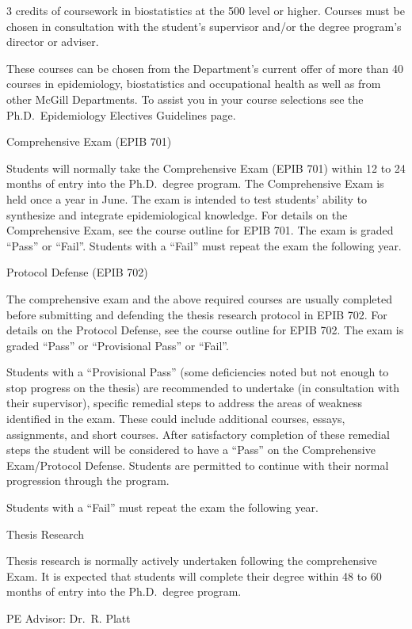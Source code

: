 \documentclass[
]{book}
\begin{document}
3 credits of coursework in biostatistics at the 500 level or higher. Courses must be chosen in consultation with the student's supervisor and/or the degree program's director or adviser.

These courses can be chosen from the Department's current offer of more than 40 courses in epidemiology, biostatistics and occupational health as well as from other McGill Departments. To assist you in your course selections see the Ph.D.~Epidemiology Electives Guidelines page.

Comprehensive Exam (EPIB 701)

Students will normally take the Comprehensive Exam (EPIB 701) within 12 to 24 months of entry into the Ph.D.~degree program. The Comprehensive Exam is held once a year in June. The exam is intended to test students' ability to synthesize and integrate epidemiological knowledge. For details on the Comprehensive Exam, see the course outline for EPIB 701. The exam is graded ``Pass'' or ``Fail''. Students with a ``Fail'' must repeat the exam the following year.

Protocol Defense (EPIB 702)

The comprehensive exam and the above required courses are usually completed before submitting and defending the thesis research protocol in EPIB 702. For details on the Protocol Defense, see the course outline for EPIB 702. The exam is graded ``Pass'' or ``Provisional Pass'' or ``Fail''.

Students with a ``Provisional Pass'' (some deficiencies noted but not enough to stop progress on the thesis) are recommended to undertake (in consultation with their supervisor), specific remedial steps to address the areas of weakness identified in the exam. These could include additional courses, essays, assignments, and short courses. After satisfactory completion of these remedial steps the student will be considered to have a ``Pass'' on the Comprehensive Exam/Protocol Defense. Students are permitted to continue with their normal progression through the program.

Students with a ``Fail'' must repeat the exam the following year.

Thesis Research

Thesis research is normally actively undertaken following the comprehensive Exam. It is expected that students will complete their degree within 48 to 60 months of entry into the Ph.D.~degree program.

PE Advisor:
Dr.~R. Platt
\end{document}
